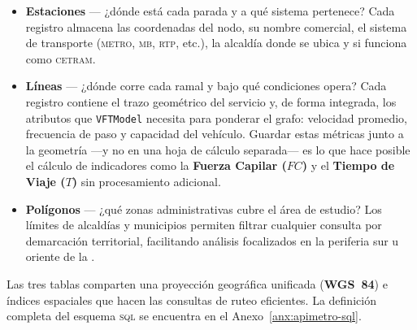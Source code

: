 \begin{itemize}
    \item \textbf{Estaciones} — ¿dónde está cada parada y a qué sistema
    pertenece? Cada registro almacena las coordenadas del nodo, su nombre
    comercial, el sistema de transporte (\textsc{metro}, \textsc{mb},
    \textsc{rtp}, etc.), la alcaldía donde se ubica y si funciona como
    \textsc{cetram}.

    \item \textbf{Líneas} — ¿dónde corre cada ramal y bajo qué condiciones
    opera? Cada registro contiene el trazo geométrico del servicio y, de forma
    integrada, los atributos que \texttt{VFTModel} necesita para ponderar el
    grafo: velocidad promedio, frecuencia de paso y capacidad del vehículo.
    Guardar estas métricas junto a la geometría —y no en una hoja de cálculo
    separada— es lo que hace posible el cálculo de indicadores como la
    \textbf{Fuerza Capilar ($FC$)} y el \textbf{Tiempo de Viaje ($T$)} sin
    procesamiento adicional.

    \item \textbf{Polígonos} — ¿qué zonas administrativas cubre el área de
    estudio? Los límites de alcaldías y municipios permiten filtrar cualquier
    consulta por demarcación territorial, facilitando análisis focalizados en
    la periferia sur u oriente de la \zmvm.
\end{itemize}

Las tres tablas comparten una proyección geográfica unificada (\textbf{WGS~84})
e índices espaciales que hacen las consultas de ruteo eficientes. La definición
completa del esquema \textsc{sql} se encuentra en el
Anexo~\ref{anx:apimetro-sql}.
